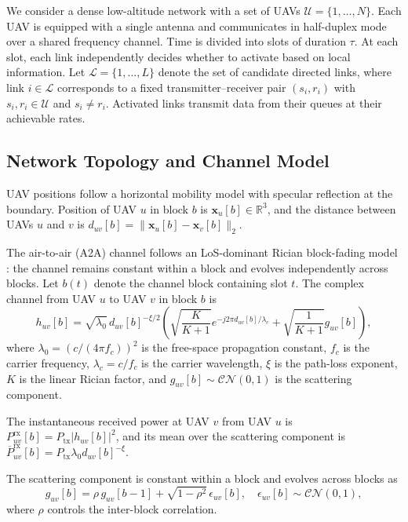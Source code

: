 \documentclass[letterpaper,journal]{IEEEtran}
\begin{document}
	We consider a dense low-altitude network with a set of UAVs $\mathcal{U} = \{1, \ldots, N\}$. Each UAV is equipped with a single antenna and communicates in half-duplex mode over a shared frequency channel. Time is divided into slots of duration $\tau$.
	At each slot, each link independently decides whether to activate based on local information. Let $\mathcal{L} = \{1, \ldots, L\}$ denote the set of candidate directed links, where link $i \in \mathcal{L}$ corresponds to a fixed transmitter--receiver pair $(s_i, r_i)$ with $s_i, r_i \in \mathcal{U}$ and $s_i \neq r_i$. Activated links transmit data from their queues at their achievable rates.
	
	\subsection{Network Topology and Channel Model}
	
	UAV positions follow a horizontal mobility model with specular reflection at the boundary. Position of UAV $u$ in block $b$ is $\mathbf{x}_u[b] \in \mathbb{R}^3$, and the distance between UAVs $u$ and $v$ is $d_{uv}[b] = \|\mathbf{x}_u[b] - \mathbf{x}_v[b]\|_2$.
	
	The air-to-air (A2A) channel follows an LoS-dominant Rician block-fading model \cite{liu2019A2AModel}: the channel remains constant within a block and evolves independently across blocks. Let $b(t)$ denote the channel block containing slot $t$. The complex channel from UAV $u$ to UAV $v$ in block $b$ is
	\begin{equation}
		h_{uv}[b] = \sqrt{\lambda_0}\, d_{uv}[b]^{-\xi/2}
		\left( \sqrt{\frac{K}{K+1}} e^{-j2\pi d_{uv}[b]/\lambda_c}
		+ \sqrt{\frac{1}{K+1}} g_{uv}[b] \right),
		\label{eq:rician_channel}
	\end{equation}
	where $\lambda_0 = (c/(4\pi f_c))^2$ is the free-space propagation constant, $f_c$ is the carrier frequency, $\lambda_c = c/f_c$ is the carrier wavelength, $\xi$ is the path-loss exponent, $K$ is the linear Rician factor, and $g_{uv}[b] \sim \mathcal{CN}(0,1)$ is the scattering component.
	
	The instantaneous received power at UAV $v$ from UAV $u$ is $P^{\mathrm{rx}}_{uv}[b] = P_{\mathrm{tx}}|h_{uv}[b]|^2$, and its mean over the scattering component is $\overline{P}^{\mathrm{rx}}_{uv}[b] = P_{\mathrm{tx}}\lambda_0 d_{uv}[b]^{-\xi}$.
	
	The scattering component is constant within a block and evolves across blocks as
	\begin{equation}
		g_{uv}[b] = \rho\, g_{uv}[b-1] + \sqrt{1-\rho^2}\, \epsilon_{uv}[b],
		\quad \epsilon_{uv}[b] \sim \mathcal{CN}(0,1),
		\label{eq:correlated_fading}
	\end{equation}
	where $\rho$ controls the inter-block correlation.
	
\end{document}
